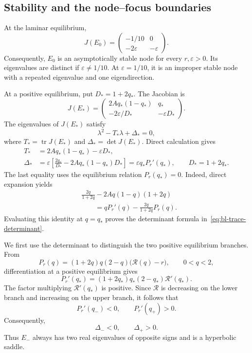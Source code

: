 \documentclass[11pt,reqno]{amsart}
\theoremstyle{plain}
\theoremstyle{definition}
\theoremstyle{remark}
\begin{document}
\subsection{Stability and the node--focus boundaries}
\label{subsec:bl-stability}

At the laminar equilibrium,
\[
J(E_0)
=
\begin{pmatrix}
-1/10 & 0\\
-2\varepsilon & -\varepsilon
\end{pmatrix}.
\]
Consequently, $E_0$ is an asymptotically stable node for every
$r,\varepsilon>0$. Its eigenvalues are distinct if
$\varepsilon\neq1/10$. At $\varepsilon=1/10$, it is an improper
stable node with a repeated eigenvalue and one eigendirection.

At a positive equilibrium, put $D_*=1+2q_*$. The Jacobian is
\begin{equation}
J(E_*)
=
\begin{pmatrix}
2Aq_*(1-q_*) & q_*\\[1mm]
-2\varepsilon/D_* & -\varepsilon D_*
\end{pmatrix}.
\label{eq:bl-J-positive}
\end{equation}
The eigenvalues of $J(E_*)$ satisfy
\[
\lambda^2-T_*\lambda+\Delta_*=0,
\]
where $T_*=\operatorname{tr}J(E_*)$ and
$\Delta_*=\det J(E_*)$. Direct calculation gives
\begin{equation}
\begin{aligned}
T_*
&=
2Aq_*(1-q_*)-\varepsilon D_*,
\\
\Delta_*
&=
\varepsilon
\left[
\frac{2q_*}{D_*}
-
2Aq_*(1-q_*)D_*
\right]
=
\varepsilon q_*P_r'(q_*),
\qquad D_*=1+2q_*.
\end{aligned}
\label{eq:bl-trace-determinant}
\end{equation}
The last equality uses the equilibrium relation $P_r(q_*)=0$.
Indeed, direct expansion yields
\[
\begin{aligned}
&
\frac{2q}{1+2q}
-
2Aq(1-q)(1+2q)
\\
&\qquad
=
qP_r'(q)
-
\frac{2q}{1+2q}P_r(q).
\end{aligned}
\]
Evaluating this identity at $q=q_*$ proves the determinant
formula in~\eqref{eq:bl-trace-determinant}.

We first use the determinant to distinguish the two positive
equilibrium branches. From
\[
P_r(q)
=
(1+2q)q(2-q)\bigl(\mathcal R(q)-r\bigr),
\qquad 0<q<2,
\]
differentiation at a positive equilibrium gives
\[
P_r'(q_*)
=
(1+2q_*)q_*(2-q_*)\mathcal R'(q_*).
\]
The factor multiplying $\mathcal R'(q_*)$ is positive.
Since $\mathcal R$ is decreasing on the lower branch and
increasing on the upper branch, it follows that
\[
P_r'(q_-)<0,
\qquad
P_r'(q_+)>0.
\]
Consequently,
\[
\Delta_-<0,
\qquad
\Delta_+>0.
\]
Thus $E_-$ always has two real eigenvalues of opposite signs
and is a hyperbolic saddle.
\end{document}
